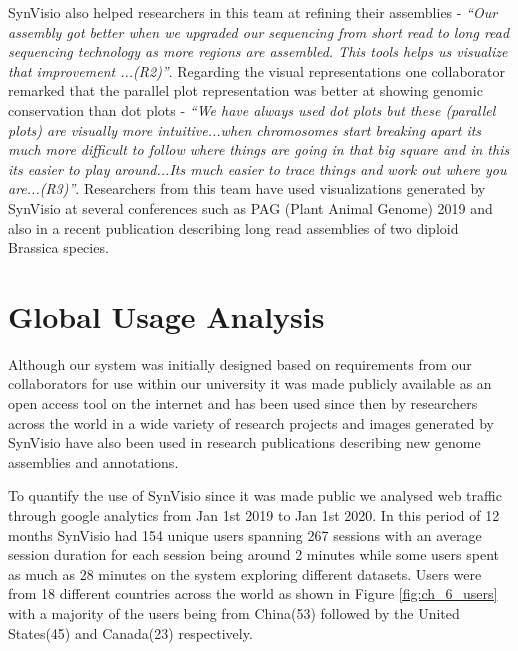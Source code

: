SynVisio also helped researchers in this team at refining their assemblies - \textit{``Our assembly got better when we upgraded our sequencing from short read to long read sequencing technology as more regions are assembled. This tools helps us visualize that improvement ...(R2)''}. Regarding the visual representations one collaborator remarked that the parallel plot representation was better at showing genomic conservation than dot plots - \textit{``We have always used dot plots but these (parallel plots) are visually more intuitive...when chromosomes start breaking apart its much more difficult to follow where things are going in that big square and in this its easier to play around...Its much easier to trace things and work out where you are...(R3)''}. Researchers from this team have used visualizations generated by SynVisio at several conferences such as PAG (Plant Animal Genome) 2019 \cite{brassicapag} and also in a recent publication describing long read assemblies of two diploid Brassica species\cite{perumal2020high}.
 
\section{Global Usage Analysis}

Although our system was initially designed based on requirements from our collaborators for use within our university it was made publicly available as an open access tool on the internet and has been used since then by researchers across the world in a wide variety of research projects and images generated by SynVisio have also been used in research publications describing new genome assemblies and annotations\cite{mathers2020improved,perumal2020high}.

To quantify the use of SynVisio since it was made public we analysed web traffic through google analytics  from Jan 1st 2019 to Jan 1st 2020. In this period of 12 months SynVisio had 154 unique users spanning 267 sessions with an average session duration for each session being around 2 minutes while some users spent as much as 28 minutes on the system exploring different datasets. Users were from 18 different countries across the world as shown in Figure \ref{fig:ch_6_users} with a majority of the users being from China(53) followed by the United States(45) and Canada(23) respectively.

